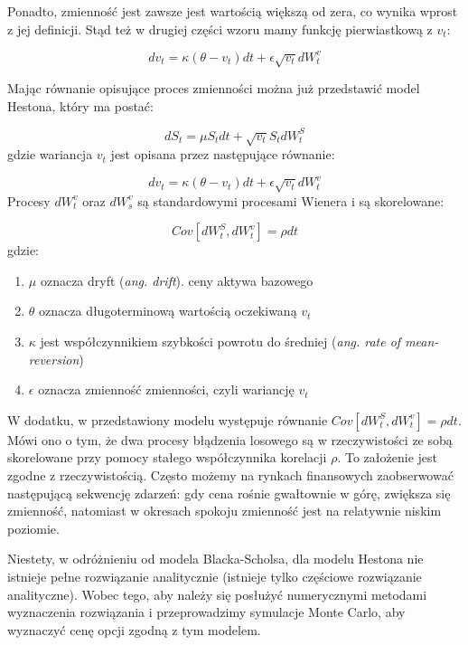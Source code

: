 \documentclass{pracamgr}
\begin{document}
Ponadto, zmienność jest zawsze jest wartością większą od zera, co wynika wprost z jej definicji. Stąd też w drugiej części wzoru mamy funkcję pierwiastkową z $v_t$: 

\begin{equation} 
dv_t  = \kappa (\theta - v_t)dt + \epsilon \sqrt{v_t} dW_t^v 
\end{equation}

Mając równanie opisujące proces zmienności można już przedstawić model Hestona, który ma postać:

\begin{equation}
dS_t  = \mu S_t dt + \sqrt{v_t} S_t dW^S_t
\end{equation}
gdzie wariancja $v_t$ jest opisana przez następujące równanie: 

\begin{equation}
dv_t  = \kappa (\theta - v_t)dt + \epsilon \sqrt{v_t} dW_t^v 
\end{equation}
Procesy $dW_t^v$ oraz $dW_s^v$ są standardowymi procesami Wienera i są skorelowane:

\begin{equation}
Cov[dW^S_t, dW^v_t] = \rho dt 
\end{equation}
gdzie:

\begin{enumerate}
\item $\mu$ oznacza dryft (\textit{ang. drift}). ceny aktywa bazowego 
\item $\theta$ oznacza długoterminową wartością oczekiwaną $v_t$
\item $\kappa$ jest współczynnikiem szybkości powrotu do średniej (\textit{ang. rate of mean-reversion})
\item $\epsilon$ oznacza zmienność zmienności, czyli wariancję $v_t$
\end{enumerate}

W dodatku, w przedstawiony modelu występuje równanie $Cov[dW^S_t, dW^v_t] = \rho dt $. Mówi ono o tym, że 
dwa procesy błądzenia losowego są w rzeczywistości ze sobą skorelowane przy pomocy stałego współczynnika 
korelacji $\rho$.
To założenie jest zgodne z rzeczywistością. Często możemy na rynkach finansowych zaobserwować następującą sekwencję zdarzeń: gdy cena rośnie gwałtownie w górę, zwiększa się zmienność, 
natomiast w okresach spokoju zmienność jest na relatywnie niskim poziomie.

Niestety, w odróżnieniu od modela Blacka-Scholsa, dla modelu Hestona nie istnieje pełne rozwiązanie analitycznie (istnieje tylko częściowe rozwiązanie analityczne). Wobec tego, aby należy się posłużyć numerycznymi metodami wyznaczenia rozwiązania i przeprowadzimy symulacje Monte Carlo, aby wyznaczyć 
cenę opcji zgodną z tym modelem.
\end{document}
